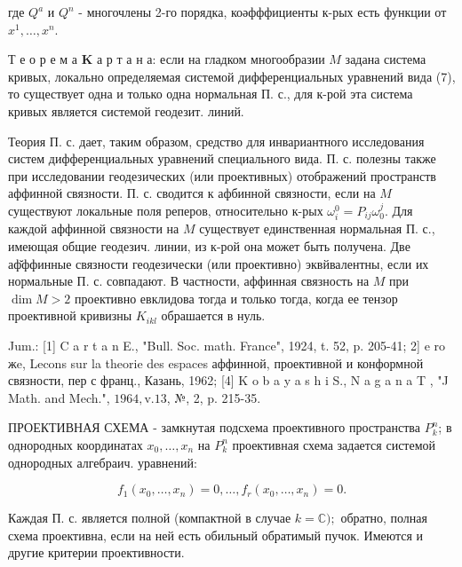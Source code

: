 \documentclass[10pt]{article}
\begin{document}
где $Q^{a}$ и $Q^{n}$ - многочлены 2-го порядка, коәфффициенты к-рых есть функции от $x^{1}, \ldots, x^{n}$.



Т е о р е м а $\boldsymbol{K}$ а р т а н а: если на гладком многообразии $M$ задана система кривых, локально определяемая системой дифференциальных уравнений вида (7), то существует одна и только одна нормальная П. с., для к-рой эта система кривых является системой геодезит. линий.



Теория П. с. дает, таким образом, средство для инвариантного исследования систем дифференциальных уравнений специального вида. П. с. полезны также при исследовании геодезических (или проективных) отображений пространств аффинной связности. П. с. сводится к афбинной связности, если на $M$ существуют локальные поля реперов, относительно к-рых $\omega_{i}^{0}=P_{i j} \omega_{0}^{j}$. Для каждой аффинной связности на $M$ существует единственная нормальная П. с., имеющая общие геодезич. линии, из к-рой она может быть получена. Две аф̆ффинные связности геодезически (или проективно) эквйвалентны, если их нормальные П. с. совпадают. В частности, аффинная связность на $M$ при $\operatorname{dim} M>2$ проективно евклидова тогда и только тогда, когда ее тензор проективной кривизны $K_{i k l}$ обрашается в нуль.



Jum.: [1] C a r t a n E., "Bull. Soc. math. France", 1924, t. 52, p. 205-41; 2] e ro жe, Lecons sur la theorie des espaces аффинной, проективной и конформной связности, пер с франц., Казань, 1962; [4] K o b a y a s h i S., N a g a n a T , "J Math. and Mech.", $1964, \mathrm{v} .13$, №, 2, p. 215-35.



ПРОЕКТИВНАЯ СХЕМА - замкнутая подсхема проективного пространства $P_{k}^{n}$; в однородных координатах $x_{0}, \ldots, x_{n}$ на $P_{k}^{n}$ проективная схема задается системой однородных алгебраич. уравнений:



\[

f_{1}\left(x_{0}, \ldots, x_{n}\right)=0, \ldots, f_{r}\left(x_{0}, \ldots, x_{n}\right)=0 .

\]



Каждая П. с. является полной (компактной в случае $k=\mathbb{C}) ;$ обратно, полная схема проективна, если на ней есть обильный обратимый пучок. Имеются и другие критерии проективности.
\end{document}
